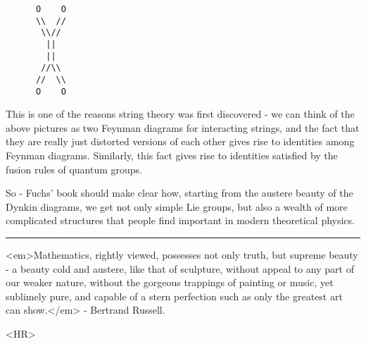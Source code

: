 \begin{verbatim}
      O    O
      \\  //
       \\//
        ||                 
        ||
       //\\
      //  \\
      O    O
\end{verbatim}
    

This is one of the reasons string theory was first discovered -
we can think of the above pictures as two Feynman diagrams for
interacting strings, and the fact that they are really just distorted
versions of each other gives rise to identities among Feynman diagrams.
Similarly, this fact gives rise to identities satisfied by the fusion
rules of quantum groups.

So - Fuchs' book should make clear how, starting from the austere
beauty of the Dynkin diagrams, we get not only simple Lie groups, but
also a wealth of more complicated structures that people find important
in modern theoretical physics.  

\par\noindent\rule{\textwidth}{0.4pt}
<em>Mathematics, rightly viewed, possesses not only truth, but supreme 
beauty - a beauty cold and austere, like that of sculpture, without appeal 
to any part of our weaker nature, without the gorgeous trappings of painting 
or music, yet sublimely pure, and capable of a stern perfection such as 
only the greatest art can show.</em> - Bertrand Russell.

<HR>



